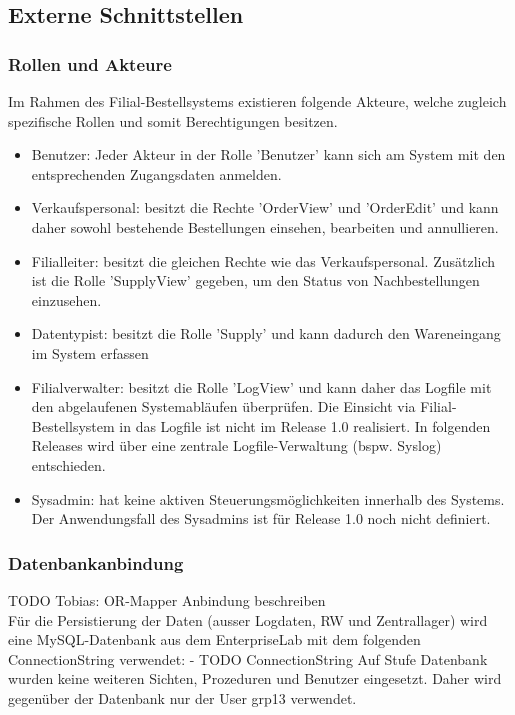 \subsection{Externe Schnittstellen}
\subsubsection{Rollen und Akteure}
Im Rahmen des Filial-Bestellsystems existieren folgende Akteure, welche zugleich spezifische Rollen und somit Berechtigungen besitzen.
\begin{itemize}
	\item Benutzer: Jeder Akteur in der Rolle 'Benutzer' kann sich am System mit den entsprechenden Zugangsdaten anmelden.
	\item Verkaufspersonal: besitzt die Rechte 'OrderView' und 'OrderEdit' und kann daher sowohl bestehende Bestellungen einsehen, bearbeiten und annullieren.
	\item Filialleiter: besitzt die gleichen Rechte wie das Verkaufspersonal. Zusätzlich ist die Rolle 'SupplyView' gegeben, um den Status von Nachbestellungen einzusehen.	
	\item Datentypist: besitzt die Rolle 'Supply' und kann dadurch den Wareneingang im System erfassen
	\item Filialverwalter: besitzt die Rolle 'LogView' und kann daher das Logfile mit den abgelaufenen Systemabläufen überprüfen. Die Einsicht via Filial-Bestellsystem in das Logfile ist nicht im Release 1.0 realisiert. In folgenden Releases wird über eine zentrale Logfile-Verwaltung (bspw. Syslog) entschieden. 
	\item Sysadmin: hat keine aktiven Steuerungsmöglichkeiten innerhalb des Systems. Der Anwendungsfall des Sysadmins ist für Release 1.0 noch nicht definiert.
\end{itemize}
\subsubsection{Datenbankanbindung}
TODO Tobias: OR-Mapper Anbindung beschreiben\\

Für die Persistierung der Daten (ausser Logdaten, RW und Zentrallager) wird eine MySQL-Datenbank aus dem EnterpriseLab mit dem folgenden ConnectionString verwendet:
- TODO ConnectionString
Auf Stufe Datenbank wurden keine weiteren Sichten, Prozeduren und Benutzer eingesetzt. Daher wird gegenüber der Datenbank nur der User grp13 verwendet.

